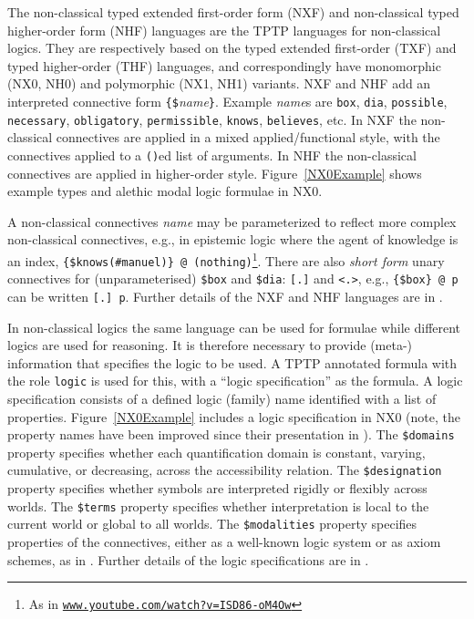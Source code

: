 \documentclass[runningheads]{llncs}
\begin{document}
The non-classical typed extended first-order form (NXF) and non-classical typed higher-order 
form (NHF) languages are the TPTP languages for non-classical logics.
They are respectively based on the typed extended first-order (TXF) and typed higher-order (THF)
languages, and correspondingly have mono\-morphic (NX0, NH0) and polymorphic (NX1, NH1) variants.
NXF and NHF add an interpreted connective form {\tt \verb|{|\$}{\em name}{\tt \verb|}|}.
Example {\em name}s are {\tt box}, {\tt dia}, {\tt possible}, {\tt necessary},
{\tt obligatory}, {\tt permissible}, {\tt knows}, {\tt believes}, etc.
In NXF the non-classical connectives are applied in a mixed applied/functional style, with the 
connectives applied to a {\tt ()}ed list of arguments.
In NHF the non-classical connectives are applied in higher-order style.
Figure~\ref{NX0Example} shows example types and alethic modal logic formulae in NX0.

A non-classical connectives {\em name} may be parameterized to reflect more complex 
non-classical connectives, e.g., in epistemic logic where the agent of knowledge is an index,
{\tt \verb|{|\$knows(\#manuel)\verb|}| @ (nothing)}\footnote{%
As in 
\href{https://www.youtube.com/watch?v=ISD86-oM4Ow}{\tt www.youtube.com/watch?v=ISD86-oM4Ow}}.
There are also {\em short form} unary connectives for (unparameterised) {\tt \$box} and 
{\tt \$dia}: {\tt [.]} and {\tt <.>}, e.g., {\tt \verb|{|\$box\verb|}| @ p} can be written 
{\tt [.] p}.
Further details of the NXF and NHF languages are in \cite{SF+22}.

In non-classical logics the same language can be used for formulae while different logics are 
used for reasoning.
It is therefore necessary to provide \mbox{(meta-)} information that specifies the
logic to be used.
A TPTP annotated formula with the role \texttt{logic} is used for this, with a ``logic 
specification'' as the formula.
A logic specification consists of a defined logic (family) name identified with a list of 
properties.
Figure~\ref{NX0Example} includes a logic specification in NX0 (note, the property names have
been improved since their presentation in \cite{SF+22}).
The {\tt \$domains} property specifies whether each quantification domain is constant, varying,
cumulative, or decreasing, across the accessibility relation.
The {\tt \$designation} property specifies whether symbols are interpreted rigidly
or flexibly
across worlds.
The {\tt \$terms} property specifies whether interpretation is local to the current world or
global to all worlds.
The {\tt \$modalities} property specifies properties of the connectives, either as a well-known 
logic system
or as axiom schemes,
as in \cite{Gar18}.
Further details of the logic specifications are in \cite{SF+22}.
\end{document}
